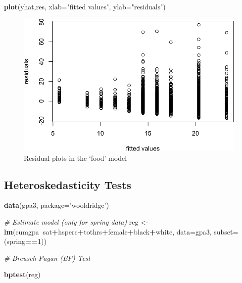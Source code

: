 \documentclass[]{book}
\newenvironment{Shaded}{\begin{snugshade}}{\end{snugshade}}
\newcommand{\CommentTok}[1]{\textcolor[rgb]{0.56,0.35,0.01}{\textit{#1}}}
\newcommand{\DataTypeTok}[1]{\textcolor[rgb]{0.13,0.29,0.53}{#1}}
\newcommand{\DecValTok}[1]{\textcolor[rgb]{0.00,0.00,0.81}{#1}}
\newcommand{\KeywordTok}[1]{\textcolor[rgb]{0.13,0.29,0.53}{\textbf{#1}}}
\newcommand{\NormalTok}[1]{#1}
\newcommand{\OperatorTok}[1]{\textcolor[rgb]{0.81,0.36,0.00}{\textbf{#1}}}
\newcommand{\StringTok}[1]{\textcolor[rgb]{0.31,0.60,0.02}{#1}}
\begin{document}
\begin{Shaded}
\begin{Highlighting}[]
\KeywordTok{plot}\NormalTok{(yhat,res, }\DataTypeTok{xlab=}\StringTok{"fitted values"}\NormalTok{, }\DataTypeTok{ylab=}\StringTok{"residuals"}\NormalTok{)}
\end{Highlighting}
\end{Shaded}

\begin{figure}

{\centering \includegraphics[width=0.8\linewidth]{MEM5220_R_files/figure-latex/fig19-2} 

}

\caption{Residual plots in the ‘food’ model }\label{fig:fig192}
\end{figure}

\hypertarget{heteroskedasticity-tests}{%
\subsection{Heteroskedasticity Tests}\label{heteroskedasticity-tests}}

\begin{Shaded}
\begin{Highlighting}[]
\KeywordTok{data}\NormalTok{(gpa3, }\DataTypeTok{package=}\StringTok{'wooldridge'}\NormalTok{)}


\CommentTok{# Estimate model (only for spring data)}
\NormalTok{reg <-}\StringTok{ }\KeywordTok{lm}\NormalTok{(cumgpa}\OperatorTok{~}\NormalTok{sat}\OperatorTok{+}\NormalTok{hsperc}\OperatorTok{+}\NormalTok{tothrs}\OperatorTok{+}\NormalTok{female}\OperatorTok{+}\NormalTok{black}\OperatorTok{+}\NormalTok{white, }
          \DataTypeTok{data=}\NormalTok{gpa3, }\DataTypeTok{subset=}\NormalTok{(spring}\OperatorTok{==}\DecValTok{1}\NormalTok{))}


\CommentTok{# Breusch-Pagan (BP) Test}

\KeywordTok{bptest}\NormalTok{(reg)}
\end{Highlighting}
\end{Shaded}
\end{document}
